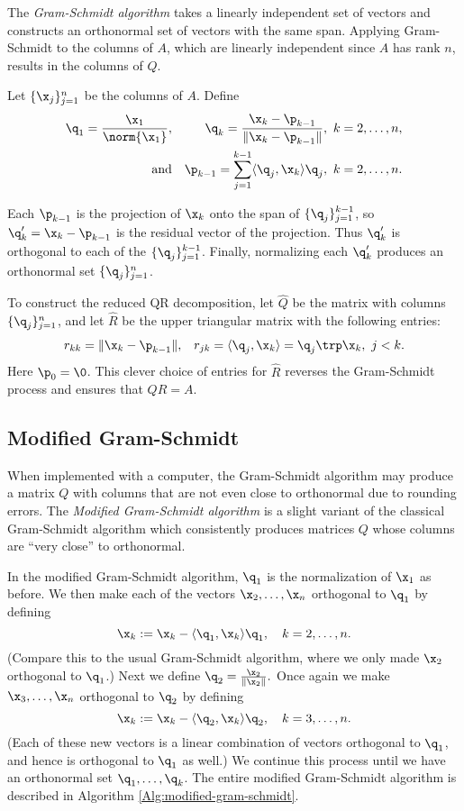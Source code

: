The \emph{Gram-Schmidt algorithm} takes a linearly independent set of vectors and constructs an orthonormal set of vectors with the same span.
Applying Gram-Schmidt to the columns of $A$, which are linearly independent since $A$ has rank $n$, results in the columns of $Q$.

Let $\{\x_j\}_{j=1}^n$ be the columns of $A$.
Define
\begin{align*}
\q_1 = \frac{\x_1}{\norm{\x_1}},
&&
\q_{k} = \frac{\x_k - \p_{k-1}}{\|\x_k - \p_{k-1}\|},\ k=2,\ldots,n,
\\
\text{and}
&&
\p_{k-1} = \sum_{j=1}^{k-1} \langle \q_j, \x_k\rangle \q_j,\ k=2,\ldots, n.
\end{align*}

Each $\p_{k-1}$ is the projection of $\x_k$ onto the span of $\{\q_j\}_{j=1}^{k-1}$, so $\q_k^\prime = \x_k - \p_{k-1}$ is the residual vector of the projection.
Thus $\q_k^\prime$ is orthogonal to each of the $\{\q_j\}_{j=1}^{k-1}$.
Finally, normalizing each $\q_k^\prime$ produces an orthonormal set $\{\q_j\}_{j=1}^n$.

To construct the reduced QR decomposition, let $\widehat{Q}$ be the matrix with columns $\{\q_j\}_{j=1}^n$, and let $\widehat{R}$ be the upper triangular matrix with the following entries:
\begin{align*}
r_{kk} = \|\x_k-\p_{k-1}\|,
&&
r_{jk} = \langle \q_j, \x_k\rangle = \q_j\trp\x_k,\ j < k.
\end{align*}
Here $\p_0 = \0$.
This clever choice of entries for $\widehat{R}$ reverses the Gram-Schmidt process and ensures that $QR = A$.


\subsection*{Modified Gram-Schmidt} %

When implemented with a computer, the Gram-Schmidt algorithm may produce a matrix $Q$ with columns that are not even close to orthonormal due to rounding errors.
The \emph{Modified Gram-Schmidt algorithm} is a slight variant of the classical Gram-Schmidt algorithm which consistently produces matrices $Q$ whose columns are ``very close'' to orthonormal.

In the modified Gram-Schmidt algorithm, $\q_1$ is the normalization of $\x_1$ as before.
We then make each of the vectors $\x_2, \ldots, \x_n$ orthogonal to $\q_1$ by defining
\[
\x_k := \x_k - \langle \q_1,\x_{k} \rangle \q_1,\quad k=2,\ldots,n.
\]
(Compare this to the usual Gram-Schmidt algorithm, where we only made $\x_2$ orthogonal to $\q_1$.)
Next we define $\q_2 = \frac{\x_2}{\|\x_2\|}.$ Once again we make $\x_3, \ldots, \x_n$ orthogonal to $\q_2$ by defining
\[
\x_k := \x_k - \langle \q_2,\x_{k} \rangle \q_2,\quad k=3,\ldots,n.
\]
(Each of these new vectors is a linear combination of vectors orthogonal to $\q_1$, and hence is orthogonal to $\q_1$ as well.)
We continue this process until we have an orthonormal set $\q_1, \ldots, \q_k$.
The entire modified Gram-Schmidt algorithm is described in Algorithm \ref{Alg:modified-gram-schmidt}.

